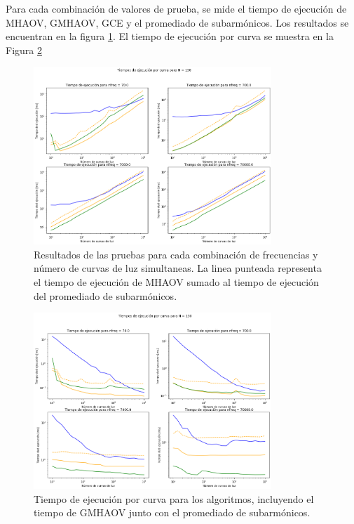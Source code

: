 Para cada combinación de valores de prueba, se mide el tiempo de ejecución de MHAOV, GMHAOV, GCE y el promediado de subarmónicos. Los resultados se encuentran en la figura \ref{fig:benchmarks}. El tiempo de ejecución por curva se muestra en la Figura \ref{fig:benchmark-por-curva}
\begin{figure}[h]

    \centering
    \includegraphics[width=0.8\textwidth]{figs/benchmarks-total.png}
    \caption{Resultados de las pruebas para cada combinación de frecuencias y número de curvas de luz simultaneas. La linea punteada representa el tiempo de ejecución de MHAOV sumado al tiempo de ejecución del promediado de subarmónicos.}
    \label{fig:benchmarks}
\end{figure}

\begin{figure}[h]
    \centering
    \includegraphics[width=0.8\textwidth]{figs/benchmarks.png}
    \caption{Tiempo de ejecución por curva para los algoritmos, incluyendo el tiempo de GMHAOV junto con el promediado de subarmónicos.}
    \label{fig:benchmark-por-curva}
\end{figure}

